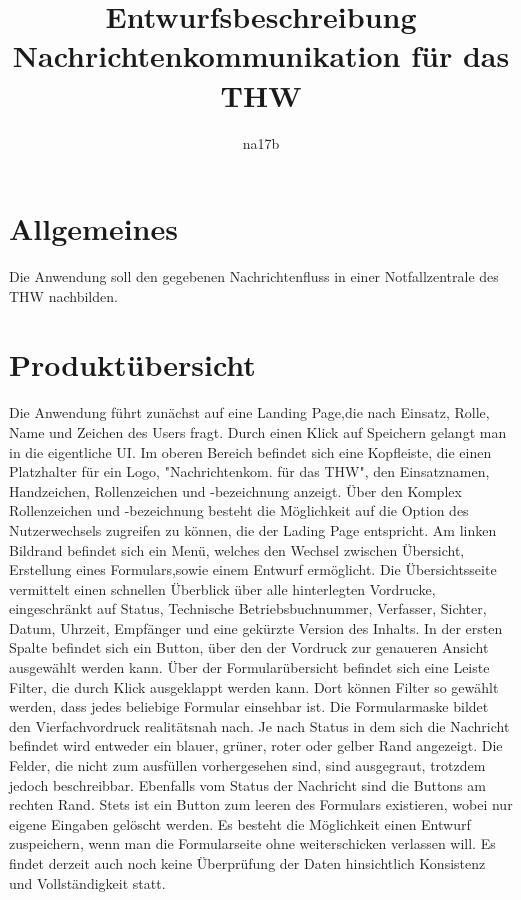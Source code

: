 \documentclass[a4paper,11pt,oneside, titlepage]{article}
\title{Entwurfsbeschreibung\\Nachrichtenkommunikation für das THW}
\author{na17b}
\date{}
\begin{document}
\maketitle


\tableofcontents


\newpage


\section{Allgemeines}
Die Anwendung soll den gegebenen Nachrichtenfluss in einer Notfallzentrale des THW nachbilden.
\section{Produktübersicht}
Die Anwendung führt zunächst auf eine Landing Page,die nach Einsatz, Rolle, Name und Zeichen des Users fragt. Durch einen Klick auf Speichern gelangt man in die eigentliche UI. Im oberen Bereich befindet sich eine Kopfleiste, die einen Platzhalter für ein Logo, "Nachrichtenkom. für das THW", den Einsatznamen, Handzeichen, Rollenzeichen und -bezeichnung anzeigt. Über den Komplex Rollenzeichen und -bezeichnung besteht die Möglichkeit auf die Option des Nutzerwechsels zugreifen zu können, die der Lading Page entspricht. Am linken Bildrand befindet sich ein Menü, welches den Wechsel zwischen Übersicht, Erstellung eines Formulars,sowie einem Entwurf ermöglicht. Die Übersichtsseite vermittelt einen schnellen Überblick über alle hinterlegten Vordrucke, eingeschränkt auf Status, Technische Betriebsbuchnummer, Verfasser, Sichter, Datum, Uhrzeit, Empfänger und eine gekürzte Version des Inhalts. In der ersten Spalte befindet sich ein Button, über den der Vordruck zur genaueren Ansicht ausgewählt werden kann. Über der Formularübersicht befindet sich eine Leiste Filter, die durch Klick ausgeklappt werden kann. Dort können Filter so gewählt werden, dass jedes beliebige Formular einsehbar ist. Die Formularmaske bildet den Vierfachvordruck realitätsnah nach. Je nach Status in dem sich die Nachricht befindet wird entweder ein blauer, grüner, roter oder gelber Rand angezeigt. Die Felder, die nicht zum ausfüllen vorhergesehen sind, sind ausgegraut, trotzdem jedoch beschreibbar. Ebenfalls vom Status der Nachricht sind die Buttons am rechten Rand. Stets ist ein Button zum leeren des Formulars existieren, wobei nur eigene Eingaben gelöscht werden. Es besteht die Möglichkeit einen Entwurf zuspeichern, wenn man die Formularseite ohne weiterschicken verlassen will. Es findet derzeit auch noch keine Überprüfung der Daten hinsichtlich Konsistenz und Vollständigkeit statt. 
\end{document}
